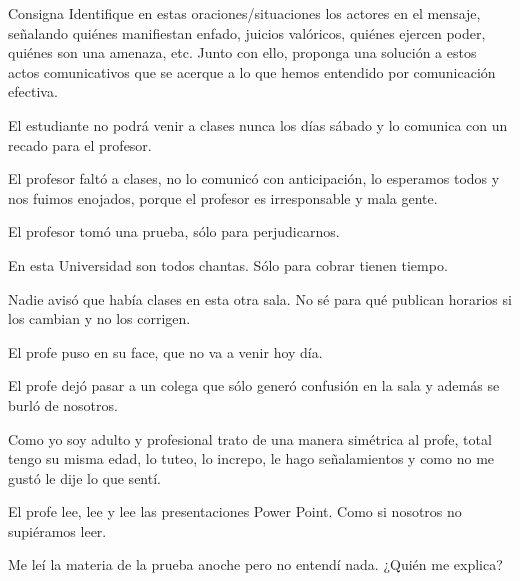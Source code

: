 \documentclass[12pt,spanish]{beamer}
\begin{document}
\begin{frame}[label={sec:orga3a838d}]{Consigna}
Identifique en estas oraciones/situaciones los actores en el mensaje, señalando quiénes manifiestan enfado, juicios valóricos, quiénes ejercen poder, quiénes son una amenaza, etc. Junto con ello, proponga una solución a estos actos comunicativos que se acerque a lo que hemos entendido por comunicación efectiva.
\end{frame}
\begin{frame}[label={sec:org9d81373}]{}
El estudiante no podrá venir a clases nunca los días sábado y lo comunica con un recado para el profesor.
\end{frame}
\begin{frame}[label={sec:org538dcc9}]{}
El profesor faltó a clases, no lo comunicó con anticipación, lo esperamos todos y nos fuimos enojados, porque el profesor es irresponsable y mala gente.
\end{frame}
\begin{frame}[label={sec:orgc0bf752}]{}
El profesor tomó una prueba, sólo para perjudicarnos.
\end{frame}
\begin{frame}[label={sec:orgec94c4e}]{}
En esta Universidad son todos chantas. Sólo para cobrar tienen tiempo.
\end{frame}
\begin{frame}[label={sec:org92d1d03}]{}
Nadie avisó que había clases en esta otra sala. No sé para qué publican horarios si los cambian y no los corrigen.
\end{frame}
\begin{frame}[label={sec:orge966fec}]{}
El profe puso en su face, que no va a venir hoy día.
\end{frame}
\begin{frame}[label={sec:orgbdf948d}]{}
El profe dejó pasar a un colega que sólo generó confusión en la sala y además se burló de nosotros.
\end{frame}
\begin{frame}[label={sec:orgb3991b4}]{}
Como yo soy adulto y profesional trato de una manera simétrica al profe, total tengo su misma edad, lo tuteo, lo increpo, le hago señalamientos y como no me gustó le dije lo que sentí.
\end{frame}
\begin{frame}[label={sec:org437b98c}]{}
El profe lee, lee y lee las presentaciones Power Point. Como si nosotros no supiéramos leer.
\end{frame}
\begin{frame}[label={sec:orgadd4965}]{}
Me leí la materia de la prueba anoche pero no entendí nada. ¿Quién me explica?
\end{frame}
\end{document}
